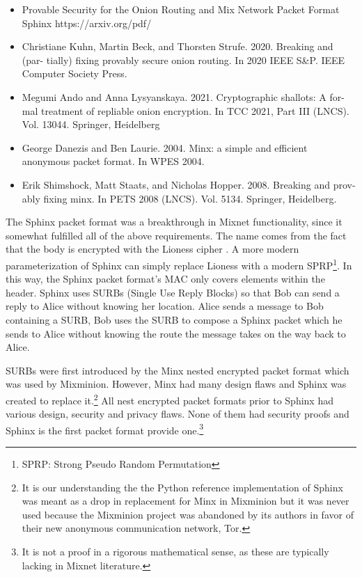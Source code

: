 \documentclass{article}
\begin{document}
\begin{itemize}
    \item Provable Security for the Onion Routing and Mix Network Packet Format Sphinx https://arxiv.org/pdf/
    \item Christiane Kuhn, Martin Beck, and Thorsten Strufe. 2020. Breaking and (par-
tially) fixing provably secure onion routing. In 2020 IEEE S&P. IEEE Computer
Society Press.
    \item Megumi Ando and Anna Lysyanskaya. 2021. Cryptographic shallots: A for-
mal treatment of repliable onion encryption. In TCC 2021, Part III (LNCS).
Vol. 13044. Springer, Heidelberg
    \item George Danezis and Ben Laurie. 2004. Minx: a simple and efficient anonymous
packet format. In WPES 2004.
    \item Erik Shimshock, Matt Staats, and Nicholas Hopper. 2008. Breaking and prov-
ably fixing minx. In PETS 2008 (LNCS). Vol. 5134. Springer, Heidelberg.
\end{itemize}



The Sphinx  packet format was a breakthrough in Mixnet functionality, since it somewhat fulfilled all of the above requirements. The name comes from the fact that the body is encrypted with the Lioness cipher . A more modern parameterization of Sphinx can simply replace Lioness with a modern SPRP\footnote{SPRP: Strong Pseudo Random Permutation}. In this way, the Sphinx packet format's MAC only covers elements within the header. Sphinx uses SURBs (Single Use Reply Blocks) so that Bob can send a reply to Alice without knowing her location. Alice sends a message to Bob containing a SURB, Bob uses the SURB to compose a Sphinx packet which he sends to Alice without knowing the route the message takes on the way back to Alice. 

SURBs were first introduced by the Minx  nested encrypted packet format which was used by Mixminion. However, Minx had many design flaws  and Sphinx was created to replace it.\footnote{It is our understanding the the Python reference implementation of Sphinx was meant as a drop in replacement for Minx in Mixminion but it was never used because the Mixminion project was abandoned by its authors in favor of their new anonymous communication network, Tor.} All nest encrypted packet formats prior to Sphinx had various design, security and privacy flaws. None of them had security proofs and Sphinx is the first packet format provide one.\footnote{It is not a proof in a rigorous mathematical sense, as these are typically lacking in Mixnet literature.}
\end{document}

